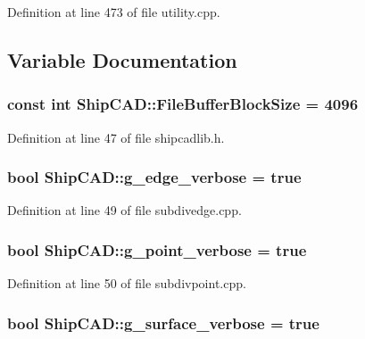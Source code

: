 Definition at line 473 of file utility.\-cpp.



\subsection{Variable Documentation}
\hypertarget{namespaceShipCAD_afeba968c9abef53c8d1ff63855076dec}{
\subsubsection[{File\-Buffer\-Block\-Size}]{\setlength{\rightskip}{0pt plus 5cm}const int Ship\-C\-A\-D\-::\-File\-Buffer\-Block\-Size = 4096}}\label{namespaceShipCAD_afeba968c9abef53c8d1ff63855076dec}


Definition at line 47 of file shipcadlib.\-h.

\hypertarget{namespaceShipCAD_ad5a157bd082e37a863f05b7c54a1d7cc}{
\subsubsection[{g\-\_\-edge\-\_\-verbose}]{\setlength{\rightskip}{0pt plus 5cm}bool Ship\-C\-A\-D\-::g\-\_\-edge\-\_\-verbose = true}}\label{namespaceShipCAD_ad5a157bd082e37a863f05b7c54a1d7cc}


Definition at line 49 of file subdivedge.\-cpp.

\hypertarget{namespaceShipCAD_ae059a88fbc18c56ceee2fd1cd7f2aad0}{
\subsubsection[{g\-\_\-point\-\_\-verbose}]{\setlength{\rightskip}{0pt plus 5cm}bool Ship\-C\-A\-D\-::g\-\_\-point\-\_\-verbose = true}}\label{namespaceShipCAD_ae059a88fbc18c56ceee2fd1cd7f2aad0}


Definition at line 50 of file subdivpoint.\-cpp.

\hypertarget{namespaceShipCAD_a45538d3cd2c9293bf0bd4b09a23670ac}{
\subsubsection[{g\-\_\-surface\-\_\-verbose}]{\setlength{\rightskip}{0pt plus 5cm}bool Ship\-C\-A\-D\-::g\-\_\-surface\-\_\-verbose = true}}\label{namespaceShipCAD_a45538d3cd2c9293bf0bd4b09a23670ac}


